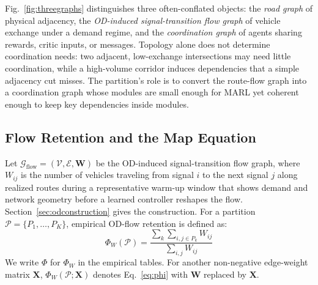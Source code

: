 \documentclass[journal]{IEEEtran}
\theoremstyle{definition}
\begin{document}
Fig.~\ref{fig:threegraphs} distinguishes three often-conflated objects: the \emph{road graph} of physical adjacency, the \emph{OD-induced signal-transition flow graph} of vehicle exchange under a demand regime, and the \emph{coordination graph} of agents sharing rewards, critic inputs, or messages. Topology alone does not determine coordination needs: two adjacent, low-exchange intersections may need little coordination, while a high-volume corridor induces dependencies that a simple adjacency cut misses. The partition’s role is to convert the route-flow graph into a coordination graph whose modules are small enough for MARL yet coherent enough to keep key dependencies inside modules.


\subsection{Flow Retention and the Map Equation}
\label{sec:flowretention}

Let $\mathcal{G}_{\mathrm{flow}}=(\mathcal{V},\mathcal{E},\mathbf{W})$ be the OD-induced signal-transition flow graph, where $W_{ij}$ is the number of vehicles traveling from signal $i$ to the next signal $j$ along realized routes during a representative warm-up window that shows demand and network geometry before a learned controller reshapes the flow.
Section~\ref{sec:odconstruction} gives the construction.
For a partition $\mathcal{P}{=}\{P_1,\ldots,P_K\}$, empirical OD-flow retention is defined as:
\begin{equation}
    \Phi_W(\mathcal{P})
    =
    \frac{\sum_k\sum_{i,j\in P_k} W_{ij}}
    {\sum_{i,j} W_{ij}}
    \label{eq:phi}
\end{equation}
We write $\Phi$ for $\Phi_W$ in the empirical tables.
For another non-negative edge-weight matrix $\mathbf{X}$, $\Phi_W(\mathcal{P};\mathbf{X})$ denotes Eq.~\eqref{eq:phi} with $\mathbf{W}$ replaced by $\mathbf{X}$.
\end{document}
